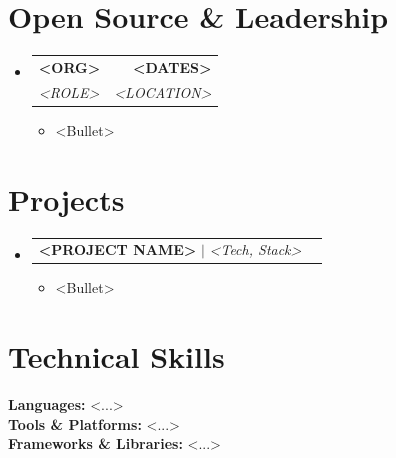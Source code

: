 \documentclass[letterpaper,10.5pt]{article}
\makeatletter
\newcommand{\resumeItem}[1]{
  \item\small{
    {#1 \vspace{-2pt}}
  }
}
\newcommand{\resumeSubheading}[4]{
  \vspace{-2pt}\item
    \begin{tabular*}{1.0\textwidth}[t]{l@{\extracolsep{\fill}}r}
      \textbf{#1} & \textbf{\small #2} \\
      \textit{\small#3} & \textit{\small #4} \\
    \end{tabular*}\vspace{-7pt}
}
\newcommand{\resumeProjectHeading}[2]{
    \item
    \begin{tabular*}{1.001\textwidth}{l@{\extracolsep{\fill}}r}
      \small#1 & \textbf{\small #2}\\
    \end{tabular*}\vspace{-7pt}
}
\newcommand{\resumeSubHeadingListStart}{\begin{itemize}[leftmargin=0.0in, label={}]}
\newcommand{\resumeSubHeadingListEnd}{\end{itemize}}
\newcommand{\resumeItemListStart}{\begin{itemize}}
\newcommand{\resumeItemListEnd}{\end{itemize}\vspace{-5pt}}
\makeatother
\begin{document}
\section{Open Source \& Leadership}
    \resumeSubHeadingListStart
    \resumeSubheading{<ORG>}{<DATES>}{<ROLE>}{<LOCATION>}
        \resumeItemListStart
            \resumeItem{<Bullet>}
        \resumeItemListEnd
    \resumeSubHeadingListEnd
    \vspace{-16pt}

\section{Projects}
    \vspace{-5pt}
    \resumeSubHeadingListStart
      \resumeProjectHeading
          {\textbf{<PROJECT NAME>} $|$ \emph{<Tech, Stack>}}{}
            \resumeItemListStart
              \resumeItem{<Bullet>}
            \resumeItemListEnd
    \resumeSubHeadingListEnd
\vspace{-15pt}

\section{Technical Skills}
 \begin{itemize}[leftmargin=0.15in, label={}]
    \small{\item{
    \textbf{Languages:} <...> \\
    \textbf{Tools \& Platforms:} <...> \\
    \textbf{Frameworks \& Libraries:} <...> \\
    }}
 \end{itemize}
 \vspace{-14pt}
\end{document}
